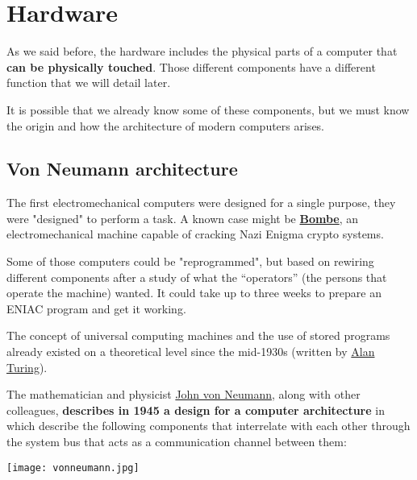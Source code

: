 \chapter{Hardware}

As we said before, the hardware includes the physical parts of a computer that \textbf{can be physically touched}. Those different components have a different function that we will detail later.

It is possible that we already know some of these components, but we must know the origin and how the architecture of modern computers arises.

\section{Von Neumann architecture}

The first electromechanical computers were designed for a single purpose, they were "designed" to perform a task. A known case might be \href{https://en.wikipedia.org/wiki/Bombe}{\textbf{Bombe}}, an electromechanical machine capable of cracking Nazi Enigma crypto systems. 

Some of those computers could be "reprogrammed", but based on rewiring different components after a study of what the “operators” (the persons that operate the machine) wanted. It could take up to three weeks to prepare an ENIAC program and get it working.

The concept of universal computing machines and the use of stored programs already existed on a theoretical level since the mid-1930s (written by \href{https://es.wikipedia.org/wiki/Alan_Turing}{Alan Turing}).

The mathematician and physicist \href{https://es.wikipedia.org/wiki/John_von_Neumann}{John von Neumann}, along with other colleagues, \textbf{describes in 1945 a design for a computer architecture} in which describe the following components that interrelate with each other through the system bus that acts as a communication channel between them:

\vspace{-10pt}
\begin{center}
    \texttt{[image: vonneumann.jpg]}
\end{center}


